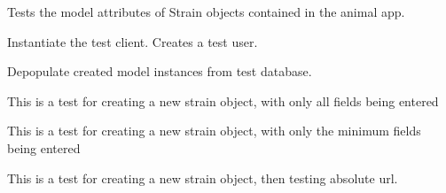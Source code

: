 \documentclass[letterpaper,10pt,english]{sphinxmanual}
\begin{document}
\begin{fulllineitems}
\label{animals:mousedb.animal.tests.StrainModelTests}
Tests the model attributes of Strain objects contained in the animal app.

\begin{fulllineitems}
\label{animals:mousedb.animal.tests.StrainModelTests.setUp}
Instantiate the test client.  Creates a test user.

\end{fulllineitems}


\begin{fulllineitems}
\label{animals:mousedb.animal.tests.StrainModelTests.tearDown}
Depopulate created model instances from test database.

\end{fulllineitems}


\begin{fulllineitems}
\label{animals:mousedb.animal.tests.StrainModelTests.test_create_strain_all}
This is a test for creating a new strain object, with only all fields being entered

\end{fulllineitems}


\begin{fulllineitems}
\label{animals:mousedb.animal.tests.StrainModelTests.test_create_strain_minimal}
This is a test for creating a new strain object, with only the minimum fields being entered

\end{fulllineitems}


\begin{fulllineitems}
\label{animals:mousedb.animal.tests.StrainModelTests.test_strain_absolute_url}
This is a test for creating a new strain object, then testing absolute url.


\end{fulllineitems}
\end{fulllineitems}
\end{document}
